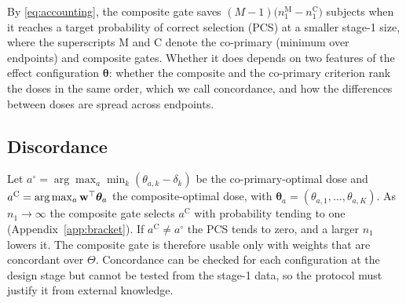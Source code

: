 By \eqref{eq:accounting}, the composite gate saves $(M-1)\big(n_1^{\mathrm{M}}-n_1^{\mathrm{C}}\big)$ subjects when it reaches a target probability of correct selection (PCS) at a smaller stage-1 size, where the superscripts M and C denote the co-primary (minimum over endpoints) and composite gates. Whether it does depends on two features of the effect configuration $\bm\theta$: whether the composite and the co-primary criterion rank the doses in the same order, which we call concordance, and how the differences between doses are spread across endpoints.

\subsection{Discordance}
Let $a^\circ=\arg\max_a\min_k(\theta_{a,k}-\delta_k)$ be the co-primary-optimal dose and $a^{\mathrm{C}}=\arg\max_a\mathbf{w}^\top\bm\theta_a$ the composite-optimal dose, with $\bm\theta_a=(\theta_{a,1},\dots,\theta_{a,K})$. As $n_1\to\infty$ the composite gate selects $a^{\mathrm{C}}$ with probability tending to one (Appendix~\ref{app:bracket}). If $a^{\mathrm{C}}\ne a^\circ$ the PCS tends to zero, and a larger $n_1$ lowers it. The composite gate is therefore usable only with weights that are concordant over $\Theta$. Concordance can be checked for each configuration at the design stage but cannot be tested from the stage-1 data, so the protocol must justify it from external knowledge.

